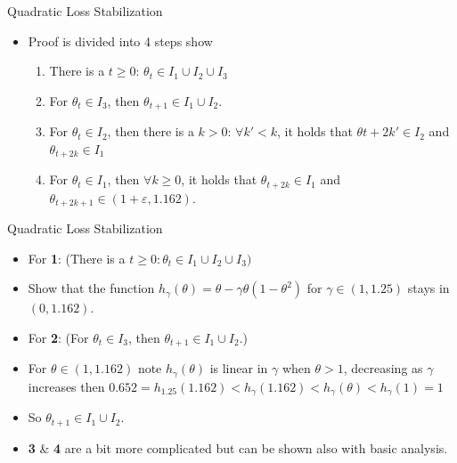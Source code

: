 \documentclass[fleqn]{beamer}
\begin{document}
    \begin{frame}{Quadratic Loss Stabilization}
        \begin{itemize}[<+->]
            \item Proof is divided into 4 steps show
                \begin{enumerate}
                    \item There is a $t\ge 0$: $\theta_t \in I_1\cup
                        I_2\cup I_3$
                    \item For $\theta_t \in I_3$, then $\theta_{t+1} \in I_1
                        \cup I_2$.
                    \item For $\theta_t \in I_2$, then there is a $k>0$:
                        $\forall k' < k$, it holds that $\theta{t+2k'} \in
                        I_2$ and $\theta_{t+2k} \in I_1$
                    \item For $\theta_t \in I_1$, then $\forall k \ge 0$, it
                        holds that
                        $\theta_{t+2k} \in I_1$ and $\theta_{t+2k+1} \in
                        (1+\varepsilon, 1.162)$.
                \end{enumerate}
        \end{itemize}
    \end{frame}

    \begin{frame}{Quadratic Loss Stabilization}
        \begin{itemize}[<+->]
            \item For \textbf{1}: (There is a $t\ge 0: \theta_t \in I_1 \cup
                I_2 \cup I_3)$
            \item Show that the function $h_\gamma(\theta) = \theta -
                \gamma\theta(1-\theta^{2})$ for $\gamma \in (1, 1.25)$ stays
                in $(0, 1.162)$.

        \vspace{0.5cm}

            \item For \textbf{2}: (For $\theta_t \in I_3$, then $\theta_{t+1} \in I_1
                        \cup I_2$.)
            \item For $\theta \in (1, 1.162)$ note $h_\gamma(\theta)$ is linear in $\gamma$ when
                $\theta>1$, decreasing as $\gamma$ increases then \newline
                $0.652 = h_{1.25}(1.162) < h_\gamma(1.162) < h_\gamma(\theta)
                    < h_\gamma(1) = 1$

            \item So $\theta_{t+1} \in I_1 \cup I_2$.


        \vspace{0.5cm}

            \item \textbf{3} \& \textbf{4} are a bit more complicated but can be
                shown also with basic analysis.
        \end{itemize}
    \end{frame}
\end{document}
